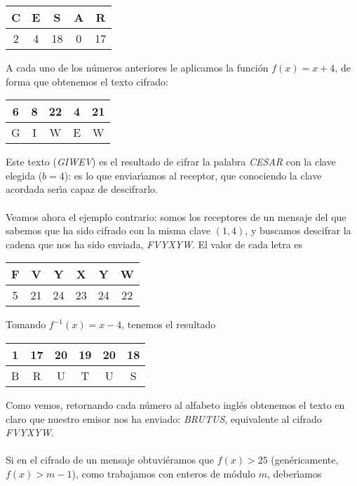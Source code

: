 \begin{center}
\begin{tabular}{|c|c|c|c|c|}
\hline
C & E & S & A & R\\
\hline
2 & 4 & 18 & 0 & 17\\
\hline
\end{tabular}
\end{center}
A cada uno de los n\'umeros anteriores le aplicamos la funci\'on $f(x)=x+4$,
de forma que obtenemos el texto cifrado: 
\begin{center}
\begin{tabular}{|c|c|c|c|c|}
\hline
6 & 8 & 22 & 4 & 21\\
\hline
G & I & W & E & W\\
\hline
\end{tabular}
\end{center}
Este texto ({\it GIWEV}) es el resultado de cifrar la palabra {\it CESAR} con
la clave elegida ($b=4$): es lo que enviar\'{\i}amos al receptor, que conociendo
la clave acordada ser\'{\i}a capaz de descifrarlo.\\
\\Veamos ahora el ejemplo contrario: somos los receptores de un mensaje del que 
sabemos que ha sido cifrado con la misma clave $(1,4)$, y buscamos descifrar la 
cadena que nos ha sido enviada, {\it FVYXYW}. El valor de cada letra es
\begin{center}
\begin{tabular}{|c|c|c|c|c|c|}
\hline
F & V & Y & X & Y & W\\
\hline
5 & 21 & 24 & 23 & 24 & 22\\
\hline
\end{tabular}
\end{center}
Tomando $f^{-1}(x)=x-4$, tenemos el resultado
\begin{center}
\begin{tabular}{|c|c|c|c|c|c|}
\hline
1 & 17 & 20 & 19 & 20& 18\\
\hline
B & R & U & T & U & S\\
\hline
\end{tabular}
\end{center}
Como vemos, retornando cada n\'umero al alfabeto ingl\'es obtenemos el texto
en claro que nuestro emisor nos ha enviado: {\it BRUTUS}, equivalente al 
cifrado {\it FVYXYW}.\\
\\Si en el cifrado de un mensaje obtuvi\'eramos que $f(x)>25$ (gen\'ericamente,
$f(x)>m-1$), como trabajamos con enteros de m\'odulo $m$, deber\'{\i}amos

